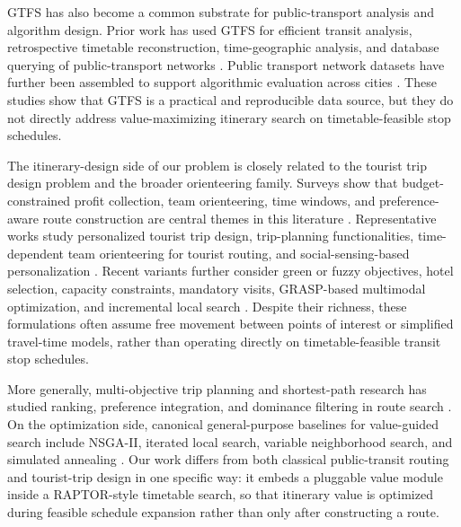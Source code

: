 GTFS has also become a common substrate for public-transport analysis and
algorithm design. Prior work has used GTFS for efficient transit analysis,
retrospective timetable reconstruction, time-geographic analysis, and database
querying of public-transport networks
\cite{godfrid2022mobilitydb,pereira2022gtfs2gps,wessel2017retrospective,wong2013leveraginggtfs}.
Public transport network datasets have further been assembled to support
algorithmic evaluation across cities \cite{kujala2018datasets}. These studies
show that GTFS is a practical and reproducible data source, but they do not
directly address value-maximizing itinerary search on timetable-feasible stop
schedules.

The itinerary-design side of our problem is closely related to the tourist trip
design problem and the broader orienteering family. Surveys show that
budget-constrained profit collection, team orienteering, time windows, and
preference-aware route construction are central themes in this literature
\cite{gunawan2016survey,ruizmeza2022slr}. Representative works study
personalized tourist trip design, trip-planning functionalities, time-dependent
team orienteering for tourist routing, and social-sensing-based personalization
\cite{gavalas2015teamorienteering,persia2020socialsensing,pilato2023modular,souffriau2010functionalities,souffriau2008personalized}.
Recent variants further consider green or fuzzy objectives, hotel selection,
capacity constraints, mandatory visits, GRASP-based multimodal optimization, and
incremental local search
\cite{ataei2022hotel,divsalar2022green,gonzaleznavasa2023transporttime,isik2024cp,luo2022capacity,marzal2024incrementalls,ruizmeza2021grasp,ruizmeza2022greenfuzzy,sylejmani2024patterns}.
Despite their richness, these formulations often assume free movement between
points of interest or simplified travel-time models, rather than operating
directly on timetable-feasible transit stop schedules.

More generally, multi-objective trip planning and shortest-path research has
studied ranking, preference integration, and dominance filtering in route
search \cite{choachaicharoenkul2022tripplanning,demeyer2013martins,fan2009urbanrouting,tenemaza2020itinerary}.
On the optimization side, canonical general-purpose baselines for value-guided
search include NSGA-II, iterated local search, variable neighborhood search,
and simulated annealing
\cite{deb2002nsga2,kirkpatrick1983sa,lourenco2003ils,mladenovic1997vns}.
Our work differs from both classical public-transit routing and tourist-trip
design in one specific way: it embeds a pluggable value module inside a
RAPTOR-style timetable search, so that itinerary value is optimized during
feasible schedule expansion rather than only after constructing a route.


